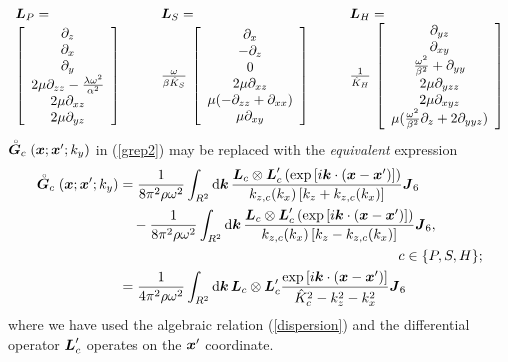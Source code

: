 \documentclass[11pt,a4paper]{article}
\newcommand{\bmi}[1]{\mbox{\boldmath$\mit #1$\unboldmath}}
\newcommand{\rf}[1]{\stackrel{\scriptscriptstyle _{\,\,\circ}}{ #1}}
\begin{document}
\begin{align} \label{Labdef}
\begin{array}{lll}
{\bmi L}_{P}=&\qquad{\bmi L}_{S}=&\qquad{\bmi L}_{H}=\\
\left[\begin{array}{c}
\partial_{z} \\
\partial_{x} \\
\partial_{y} \\
2 \mu \partial_{zz} - {\lambda \omega^{2}\over \alpha^2}\\
    2 \mu \partial_{xz} \\
   2 \mu \partial_{yz}
\end{array}\right]&\qquad
\frac{\omega }{\beta \hat{K}_{S}}\,
\left[\begin{array}{c}
\partial_{x} \\-\partial_{z} \\ 0 \\
2 \mu \partial_{xz}\\
   \mu (-\partial_{zz} + \partial_{xx}) \\
   \mu \partial_{xy}
\end{array}\right]&\qquad
\frac{1 }{\hat{K}_{H}}\,
\left[\begin{array}{c}
   \partial_{yz} \\
\partial_{xy} \\
{\omega^{2}\over \beta^2} + \partial_{yy} \\
 2 \mu \partial_{yzz}\\
    2 \mu \partial_{xyz} \\
   \mu ({\omega^{2}\over \beta^2}\partial_{z} + 2 \partial_{yyz})
\end{array}\right]
\end{array}
\end{align}
$\rf{\bmi G}_{c}({\bmi  x};{{\bmi  x}}^{\prime};k_y)$  in  (\ref{grep2}) may be replaced
with the {\em equivalent\/} expression
\begin{align}\label{grepc}
\rf{\bmi G}_{c}({\bmi  x};{{\bmi  x}}^{\prime};k_y)
&= {\frac{1}{8{ \pi }^{2} \rho \omega^2}}\int_{{R}^{2}} {\rm d}{\bmi k}\,
\frac{
{\bmi L}_{c} \otimes {\bmi  L}_{c}^{\prime}
\left(
\exp \left[{i {\bmi k}  \cdot  ({\bmi x}-{\bmi x}^{\prime})}\right]\right)
}{ {k}_{z, c }({k}_{x})\,[{k}_{z}+{k}_{z, c }({k}_{x})]} {\bmi J}_{6}\nonumber\\
&\quad -
{\frac{1}{8  { \pi }^{2}\rho \omega^2}}\int_{{R}^{2}} {\rm d}{\bmi k}\,
\frac{{\bmi L}_{c} \otimes {\bmi  L}_{c}^{\prime}\left(
\exp \left[{i {\bmi k}  \cdot  ({\bmi x}-{\bmi x}^{\prime})}\right]\right)
}{{k}_{z, c }({k}_{x})\, [{k}_{z}-{k}_{z, c }({k}_{x})]} {\bmi J}_{6},\nonumber\\
&\hspace{20em}
c\in\{ P, S , H\};\nonumber\\
&= \frac{1}{4{ \pi }^{2}\rho \omega^2}
\int_{{R}^{2}} {\rm d}{\bmi k}\, {\bmi L}_{c} \otimes {\bmi  L}_{c}^{\prime}
\frac{
\exp \left[{i {\bmi k}  \cdot  ({\bmi x}-{\bmi x}^{\prime})}\right]
}{ \hat{K}^{2}_{ c } - {k}^{2}_{z} - {k}^{2}_{x}} {\bmi J}_{6}
\end{align}
where we have used the algebraic relation (\ref{dispersion}) and
 the differential operator ${\bmi  L}_{c}^{\prime}$ operates on the
${\bmi  x}^{\prime}$ coordinate.
\end{document}
